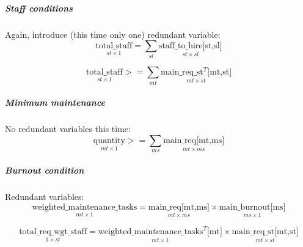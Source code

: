         \subparagraph{Staff conditions} \label{staff condition} \text{} \newline
        \hspace*{.5cm}Again, introduce (this time only one) redundant variable:
        \begin{equation}
            \underset{st\times 1}{\text{total\_staff}} = 
                \sum_{sl}\underset{st\times sl}{\text{staff\_to\_hire[st,sl]}}
        \end{equation}

        \begin{equation}
            \underset{st\times 1}{\text{total\_staff}} >= 
                \sum_{mt}\underset{mt\times st}{\text{main\_req\_st}^T\text{[mt,st]}}
        \end{equation}

        \subparagraph{Minimum maintenance} \label{minimum maintenance} \text{} \newline
        \hspace*{.5cm}No redundant variables this time:
        \begin{equation}
            \underset{mt\times 1}{\text{quantity}} >= 
                \sum_{ms}\underset{mt\times ms}{\text{main\_req[mt,ms]}}
        \end{equation}

        \subparagraph{Burnout condition} \label{burnout condition} \text{} \newline
        \hspace*{.5cm}Redundant variables:
        \begin{equation}
            \underset{mt\times 1}{\text{weighted\_maintenance\_tasks}} =  
                \underset{mt\times ms}{\text{main\_req[mt,ms]}}\times \underset{ms\times 1}{\text{main\_burnout[ms]}}
        \end{equation}

        \begin{equation}
            \underset{1\times st}{\text{total\_req\_wgt\_staff}} =  
                \underset{mt\times 1}{{\text{weighted\_maintenance\_tasks}^T\text{[mt]}}}\times \underset{mt\times st}{\text{main\_req\_st[mt,st]}}
        \end{equation}


